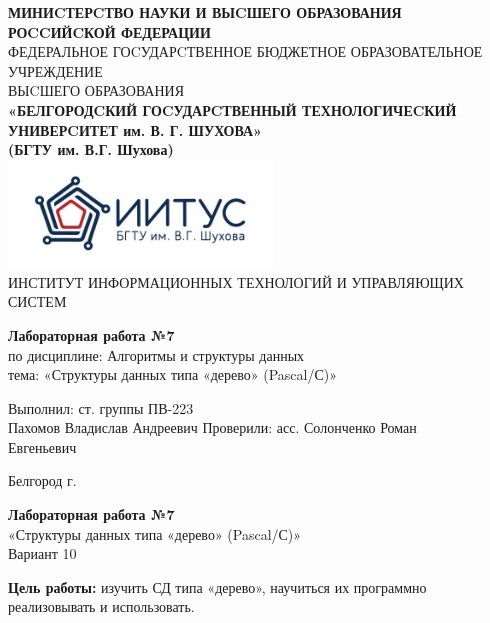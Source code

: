 \documentclass[a4paper,14pt]{extarticle}
\newcommand\textbox[1]{
	\parbox{.45\textwidth}{#1}
}
\begin{document}
\begin{center}
    \small{
        \textbf{МИНИCТЕРCТВО НАУКИ И ВЫCШЕГО ОБРАЗОВАНИЯ РОCCИЙCКОЙ ФЕДЕРАЦИИ}\\
        ФЕДЕРАЛЬНОЕ ГОCУДАРCТВЕННОЕ БЮДЖЕТНОЕ ОБРАЗОВАТЕЛЬНОЕ УЧРЕЖДЕНИЕ\\ВЫCШЕГО ОБРАЗОВАНИЯ \\
        \textbf{«БЕЛГОРОДCКИЙ ГОCУДАРCТВЕННЫЙ ТЕХНОЛОГИЧЕCКИЙ\\УНИВЕРCИТЕТ им. В. Г. ШУХОВА»\\ (БГТУ им. В.Г. Шухова)} \\
        \bigbreak
        \includegraphics[width=70mm]{log}\\
        ИНСТИТУТ ИНФОРМАЦИОННЫХ ТЕХНОЛОГИЙ И УПРАВЛЯЮЩИХ СИСТЕМ\\}
\end{center}

\vfill
\begin{center}
	\large{
		\textbf{
			Лабораторная работа №7}}\\
	\normalsize{
		по дисциплине: Алгоритмы и структуры данных \\
		тема: «Структуры данных типа «дерево» (Pascal/С)»}
\end{center}
\vfill
\hfill\textbox{
	Выполнил: ст. группы ПВ-223\\Пахомов Владислав Андреевич
	\bigbreak
	Проверили: асс. Солонченко Роман\\Евгеньевич
}
\vfill\begin{center}
	Белгород \the\year г.
\end{center}
\newpage
\begin{center}
	\textbf{Лабораторная работа №7}\\
	«Структуры данных типа «дерево» (Pascal/С)»\\
	Вариант 10
\end{center}
\textbf{Цель работы: }изучить СД типа «дерево», научиться их программно 
реализовывать и использовать.
\end{document}
